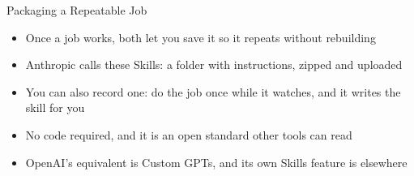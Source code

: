\documentclass[aspectratio=169]{beamer}
\begin{document}
\begin{frame}{Packaging a Repeatable Job}
    \begin{itemize}
        \item Once a job works, both let you save it so it repeats without rebuilding
        \item Anthropic calls these Skills: a folder with instructions, zipped and uploaded
        \item You can also record one: do the job once while it watches, and it writes the
              skill for you
        \item No code required, and it is an open standard other tools can read
        \item OpenAI's equivalent is Custom GPTs, and its own Skills feature is elsewhere
    \end{itemize}
\end{frame}
\end{document}
